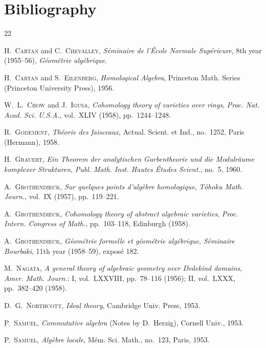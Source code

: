 \clearpage
{}
{}
\section*{Bibliography}

\begin{thebibliography}{22}

H.~\textsc{Cartan} and C.~\textsc{Chevalley},
\emph{Séminaire de l'École Normale Supérieure},
8th year (1955--56), \emph{Géométrie algébrique}.

H.~\textsc{Cartan} and S.~\textsc{Eilenberg},
\emph{Homological Algebra}, Princeton Math. Series (Princeton University
Press), 1956.

W.~L.~\textsc{Chow} and J.~\textsc{Igusa},
\emph{Cohomology theory of varieties over rings},
\emph{Proc. Nat. Acad. Sci. U.S.A.}, vol.~XLIV (1958), pp.~1244--1248.

R.~\textsc{Godement}, \emph{Théorie des faisceaux}, Actual. Scient. et Ind.,
no.~1252, Paris (Hermann), 1958.

H.~\textsc{Grauert},
\emph{Ein Theorem der analytischen Garbentheorie und die Modulräume komplexer
Strukturen}, \emph{Publ. Math. Inst. Hautes Études Scient.},
no.~5, 1960.

A.~\textsc{Grothendieck}, \emph{Sur quelques points d'algèbre homologique},
\emph{Tôhoku Math. Journ.}, vol.~IX (1957), pp.~119--221.

A.~\textsc{Grothendieck},
\emph{Cohomology theory of abstract algebraic varieties},
\emph{Proc. Intern. Congress of Math.}, pp.~103--118, Edinburgh (1958).

A.~\textsc{Grothendieck},
\emph{Géométrie formelle et géométrie algébrique},
\emph{Séminaire Bourbaki}, 11th year (1958--59), exposé 182.

M.~\textsc{Nagata},
\emph{A general theory of algebraic geometry over Dedekind domains},
\emph{Amer. Math. Journ.}: I, vol.~LXXVIII, pp.~78--116 (1956); II, vol.~LXXX,
pp.~382--420 (1958).

D.~G.~\textsc{Northcott}, \emph{Ideal theory}, Cambridge Univ. Press, 1953.

P.~\textsc{Samuel}, \emph{Commutative algebra} (Notes by D.~Herzig), Cornell
Univ., 1953.

P.~\textsc{Samuel}, \emph{Algèbre locale}, Mém. Sci. Math.,
no.~123, Paris, 1953.


\end{thebibliography}
